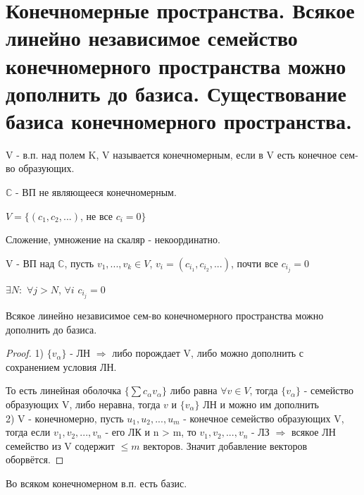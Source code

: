 \documentclass[12pt, fleqn]{article}
\begin{document}
\section{Конечномерные пространства. Всякое линейно независимое семейство конечномерного пространства можно дополнить
    до базиса. Существование базиса конечномерного пространства.}

    \begin{definition}
        V - в.п. над полем K, V называется конечномерным, если в V есть конечное сем-во образующих.
    \end{definition}

    \begin{example}
        $\mathds{C}$ - ВП не являющееся конечномерным.

        $V=\{(c_1,c_2,...)$, не все $c_i=0\}$

        Сложение, умножение на скаляр - некоординатно.

        V - ВП над $\mathds{C}$, пусть $v_1,...,v_k \in V$, $v_i=(c_{i_1}, c_{i_2},...)$, почти все $c_{i_j}=0$

        $\exists N:$ $\forall j > N$, $\forall i$ $c_{i_j}=0$
    \end{example}

    \begin{theorem}
        Всякое линейно независимое сем-во конечномерного пространства можно дополнить до базиса.
    \end{theorem}

    \begin{proof}
        1) $\{v_\alpha\}$ - ЛН $\Rightarrow$ либо порождает V, либо можно дополнить с сохранением условия ЛН.

        То есть линейная оболочка $\{\sum c_\alpha v_\alpha\}$ либо равна $\forall v \in V$, тогда $\{v_\alpha\}$ - семейство образующих V, либо неравна, тогда $v$ и $\{v_\alpha\}$ ЛН и можно им дополнить
        \\
        2) V - конечномерно, пусть $u_1,u_2,...,u_m$ - конечное семейство образующих V, тогда если $v_1,v_2,...,v_n$ - его ЛК и n > m, то $v_1,v_2,...,v_n$ - ЛЗ $\Rightarrow$ всякое ЛН семейство из V содержит $\leqslant m$ векторов. Значит добавление векторов оборвётся.
    \end{proof}


    \begin{consequence}
        Во всяком конечномерном в.п. есть базис.
    \end{consequence}
\end{document}
